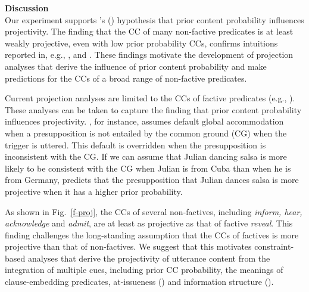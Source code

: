 \documentclass[12pt,fleqn]{article}
\newcommand{\citetpos}[1]{\citeauthor{#1}'s (\citeyear{#1})}
\newcommand{\6}{\mbox{$[\hspace*{-.6mm}[$}}
\newcommand{\9}{\mbox{$]\hspace*{-.6mm}]$}}
\begin{document}
\noindent
{\bf Discussion}
\\
Our experiment supports \citetpos{tbd-variability} hypothesis that prior content probability influences projectivity. The finding that the CC of many non-factive predicates is at least weakly projective, even with low prior probability CCs, confirms intuitions reported in, e.g., \citealt{schlenker10}, \citealt{anand-hacquard2014} and \citealt{spector-egre2015}. These findings motivate the development of projection analyses that derive the influence of prior content probability and make predictions for the CCs of a broad range of non-factive predicates.

Current projection analyses are limited to the CCs of factive predicates (e.g., \citealt{heim83,vds92,abrusan2011,brst-salt10,brst-ar}). These analyses can be taken to capture the finding that prior content probability influences projectivity. \citealt{heim83}, for instance, assumes default global accommodation when a presupposition is not entailed by the common ground (CG) when the trigger is uttered. This default is overridden when the presupposition is inconsistent with the CG. If we can assume that Julian dancing salsa is more likely to be consistent with the CG when Julian is from Cuba than when he is from Germany, \citealt{heim83} predicts that the presupposition that Julian dances salsa is more projective when it has a higher prior probability. 

As shown in Fig.~\ref{f-proj}, the CCs of several non-factives, including {\em inform, hear, acknowledge} and {\em admit}, are at least as projective as that of factive {\em reveal}. This finding challenges the long-standing assumption that the CCs of factives is more projective than that of non-factives. We suggest that this motivates constraint-based analyses that derive the projectivity of utterance content from the integration of multiple cues, including prior CC probability, the meanings of clause-embedding predicates, at-issueness (\citealt{tbd-variability}) and information structure (\citealt{tonhauser-salt26}).

\newpage


\end{document}
